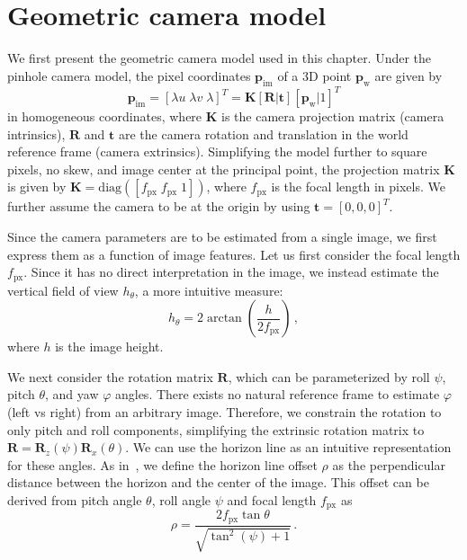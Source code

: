\section{Geometric camera model}
\label{sec:camera-model}

We first present the geometric camera model used in this chapter. 
Under the pinhole camera model, the pixel coordinates $\mathbf{p}_\mathrm{im}$ of a 3D point $\mathbf{p}_\mathrm{w}$ are given by
%
\begin{equation}
\mathbf{p}_{\mathrm{im}} = [\lambda u \; \lambda v \; \lambda]^T = \mathbf{K} \left[\mathbf{R} | \mathbf{t}\right] \left[ \mathbf{p}_{\mathrm{w}} | 1 \right]^T
\end{equation}
%
in homogeneous coordinates, where $\mathbf{K}$ is the camera projection matrix (camera intrinsics), $\mathbf{R}$ and $\mathbf{t}$ are the camera rotation and translation in the world reference frame (camera extrinsics). Simplifying the model further to square pixels, no skew, and image center at the principal point, the projection matrix $\mathbf{K}$ is given by $\mathbf{K} = \mathrm{diag}([f_{\mathrm{px}} \; f_{\mathrm{px}} \; 1])$, where $f_{\mathrm{px}}$ is the focal length in pixels. We further assume the camera to be at the origin by using $\mathbf{t} = \left[0, 0, 0\right]^T$. 

Since the camera parameters are to be estimated from a single image, we first express them as a function of image features. Let us first consider the focal length $f_\mathrm{px}$. Since it has no direct interpretation in the image, we instead estimate the vertical field of view $h_\theta$, a more intuitive measure: 
%
\begin{equation}
h_{\theta} = 2 \arctan \left( \frac{ h }{ 2f{_\mathrm{px}} } \right) \,,
\end{equation}
%
where $h$ is the image height.

We next consider the rotation matrix $\mathbf{R}$, which can be parameterized by roll $\psi$, pitch $\theta$, and yaw $\varphi$ angles. There exists no natural reference frame to estimate $\varphi$ (left vs right) from an arbitrary image. Therefore, we constrain the rotation to only pitch and roll components, simplifying the extrinsic rotation matrix to $\mathbf{R} = \mathbf{R}_z(\psi) \mathbf{R}_x(\theta)$. We can use the horizon line as an intuitive representation for these angles. As in~\cite{Workman2016}, we define the horizon line offset $\rho$ as the perpendicular distance between the horizon and the center of the image. This offset can be derived from pitch angle $\theta$, roll angle $\psi$ and focal length $f_{\mathrm{px}}$ as 
%
\begin{equation}
\rho = \frac{2 f_{\mathrm{px}} \tan\theta}{\sqrt{\tan^2\left( \psi \right) + 1}} \,.
\label{eq:horizon_offset}
\end{equation}
%

